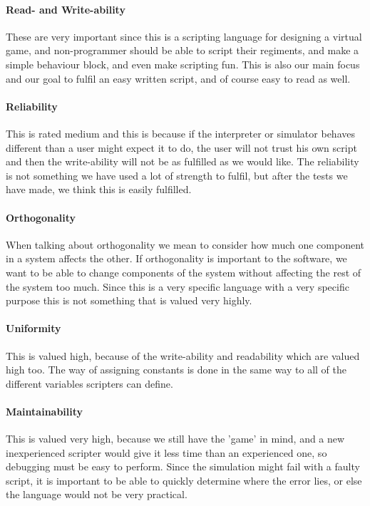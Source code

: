 \paragraph{Read- and Write-ability} These are very important since this is a scripting language for designing a virtual game, and non-programmer should be able to script their regiments, and make a simple behaviour block, and even make scripting fun. This is also our main focus and our goal to fulfil an easy written script, and of course easy to read as well.

\paragraph{Reliability} This is rated medium and this is because if the interpreter or simulator behaves different than a user might expect it to do, the user will not trust his own script and then the write-ability will not be as fulfilled as we would like. The reliability is not something we have used a lot of strength to fulfil, but after the tests we have made, we think this is easily fulfilled.

\paragraph{Orthogonality} When talking about orthogonality we mean to consider how much one component in a system affects the other. If orthogonality is important to the software, we want to be able to change components of the system without affecting the rest of the system too much. Since this is a very specific language with a very specific purpose this is not something that is valued very highly.
 
\paragraph{Uniformity} This is valued high, because of the write-ability and readability which are valued high too. The way of assigning constants is done in the same way to all of the different variables scripters can define.


\paragraph{Maintainability} This is valued very high, because we still have the 'game' in mind, and a new inexperienced scripter would give it less time than an experienced one, so debugging must be easy to perform. Since the simulation might fail with a faulty script, it is important to be able to quickly determine where the error lies, or else the language would not be very practical.

